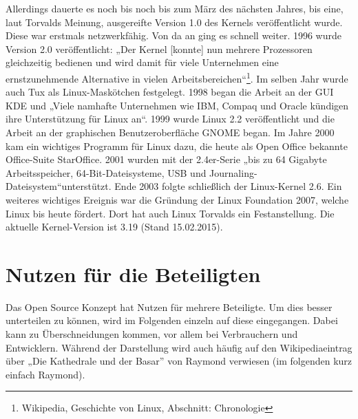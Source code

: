 \documentclass[a4paper,12pt]{article}
\begin{document}
Allerdings dauerte es noch bis noch bis zum März des nächsten Jahres, bis eine, laut Torvalds Meinung, ausgereifte Version 1.0 des Kernels veröffentlicht wurde. Diese war erstmals netzwerkfähig. Von da an ging es schnell weiter. 1996 wurde Version 2.0 veröffentlicht: „Der Kernel [konnte] nun mehrere Prozessoren gleichzeitig bedienen und wird damit für viele Unternehmen eine ernstzunehmende Alternative in vielen Arbeitsbereichen“\footnote{Wikipedia, Geschichte von Linux, Abschnitt: Chronologie}. Im selben Jahr wurde auch Tux als Linux-Maskötchen festgelegt. 1998 began die Arbeit an der GUI KDE und „Viele namhafte Unternehmen wie IBM, Compaq und Oracle kündigen ihre Unterstützung für Linux an“\footnotemark[17]. 1999 wurde Linux 2.2 veröffentlicht und die Arbeit an der graphischen Benutzeroberfläche GNOME began. Im Jahre 2000 kam ein wichtiges Programm für Linux dazu, die heute als Open Office bekannte Office-Suite StarOffice. 2001 wurden mit der 2.4er-Serie „bis zu 64 Gigabyte Arbeitsspeicher, 64-Bit-Dateisysteme, USB und Journaling-Dateisystem“\footnotemark[17] unterstützt. Ende 2003 folgte schließlich der Linux-Kernel 2.6. Ein weiteres wichtiges Ereignis war die Gründung der Linux Foundation 2007, welche Linux bis heute fördert. Dort hat auch Linux Torvalds ein Festanstellung. Die aktuelle Kernel-Version ist 3.19 (Stand 15.02.2015).
\section{Nutzen für die Beteiligten}
Das Open Source Konzept hat Nutzen für mehrere Beteiligte. Um dies besser unterteilen zu können, wird im Folgenden einzeln auf diese eingegangen. Dabei kann zu Überschneidungen kommen, vor allem bei Verbrauchern und Entwicklern. Während der Darstellung wird auch häufig auf den Wikipediaeintrag über „Die Kathedrale und der Basar” von Raymond verwiesen (im folgenden kurz einfach Raymond).
\end{document}
